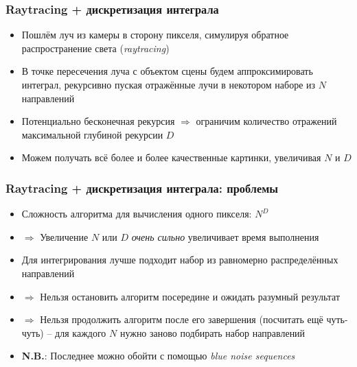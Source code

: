 \documentclass[10pt]{beamer}
\begin{document}
\begin{frame}[fragile]
\frametitle{Raytracing + дискретизация интеграла}
\begin{itemize}
\item Пошлём луч из камеры в сторону пикселя, симулируя обратное распространение света (\textit{raytracing})
\pause
\item В точке пересечения луча с объектом сцены будем аппроксимировать интеграл, рекурсивно пуская отражённые лучи в некотором наборе из \begin{math}N\end{math} направлений
\pause
\item Потенциально бесконечная рекурсия \begin{math}\Longrightarrow\end{math} ограничим количество отражений максимальной глубиной рекурсии \begin{math}D\end{math}
\pause
\item Можем получать всё более и более качественные картинки, увеличивая \begin{math}N\end{math} и \begin{math}D\end{math}
\end{itemize}
\end{frame}

\begin{frame}[fragile]
\frametitle{Raytracing + дискретизация интеграла: проблемы}
\begin{itemize}
\item Сложность алгоритма для вычисления одного пикселя: \begin{math}N^D\end{math}
\pause
\item \begin{math}\Longrightarrow\end{math} Увеличение \begin{math}N\end{math} или \begin{math}D\end{math} \textit{очень сильно} увеличивает время выполнения
\pause
\item Для интегрирования лучше подходит набор из равномерно распределённых направлений
\pause
\item \begin{math}\Longrightarrow\end{math} Нельзя остановить алгоритм посередине и ожидать разумный результат
\pause
\item \begin{math}\Longrightarrow\end{math} Нельзя продолжить алгоритм после его завершения (посчитать ещё чуть-чуть) -- для каждого \begin{math}N\end{math} нужно заново подбирать набор направлений
\pause
\item \alert{\textbf{N.B.}}: Последнее можно обойти с помощью \textit{blue noise sequences}
\end{itemize}
\end{frame}
\end{document}
